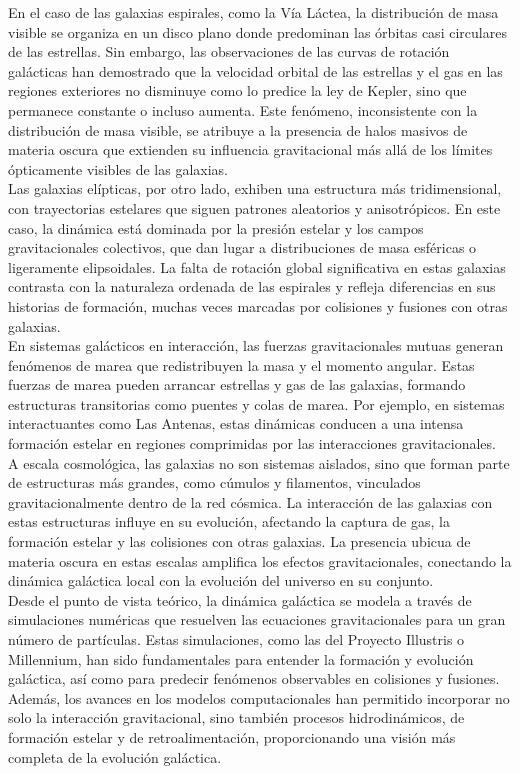 \documentclass{article}
\begin{document}
En el caso de las galaxias espirales, como la Vía Láctea, la distribución de masa visible se organiza en un disco plano donde predominan las órbitas casi circulares de las estrellas. Sin embargo, las observaciones de las curvas de rotación galácticas han demostrado que la velocidad orbital de las estrellas y el gas en las regiones exteriores no disminuye como lo predice la ley de Kepler, sino que permanece constante o incluso aumenta. Este fenómeno, inconsistente con la distribución de masa visible, se atribuye a la presencia de halos masivos de materia oscura que extienden su influencia gravitacional más allá de los límites ópticamente visibles de las galaxias. \\

Las galaxias elípticas, por otro lado, exhiben una estructura más tridimensional, con trayectorias estelares que siguen patrones aleatorios y anisotrópicos. En este caso, la dinámica está dominada por la presión estelar y los campos gravitacionales colectivos, que dan lugar a distribuciones de masa esféricas o ligeramente elipsoidales. La falta de rotación global significativa en estas galaxias contrasta con la naturaleza ordenada de las espirales y refleja diferencias en sus historias de formación, muchas veces marcadas por colisiones y fusiones con otras galaxias. \\

En sistemas galácticos en interacción, las fuerzas gravitacionales mutuas generan fenómenos de marea que redistribuyen la masa y el momento angular. Estas fuerzas de marea pueden arrancar estrellas y gas de las galaxias, formando estructuras transitorias como puentes y colas de marea. Por ejemplo, en sistemas interactuantes como Las Antenas, estas dinámicas conducen a una intensa formación estelar en regiones comprimidas por las interacciones gravitacionales. \\

A escala cosmológica, las galaxias no son sistemas aislados, sino que forman parte de estructuras más grandes, como cúmulos y filamentos, vinculados gravitacionalmente dentro de la red cósmica. La interacción de las galaxias con estas estructuras influye en su evolución, afectando la captura de gas, la formación estelar y las colisiones con otras galaxias. La presencia ubicua de materia oscura en estas escalas amplifica los efectos gravitacionales, conectando la dinámica galáctica local con la evolución del universo en su conjunto. \\

Desde el punto de vista teórico, la dinámica galáctica se modela a través de simulaciones numéricas que resuelven las ecuaciones gravitacionales para un gran número de partículas. Estas simulaciones, como las del Proyecto Illustris o Millennium, han sido fundamentales para entender la formación y evolución galáctica, así como para predecir fenómenos observables en colisiones y fusiones. Además, los avances en los modelos computacionales han permitido incorporar no solo la interacción gravitacional, sino también procesos hidrodinámicos, de formación estelar y de retroalimentación, proporcionando una visión más completa de la evolución galáctica.
\end{document}
